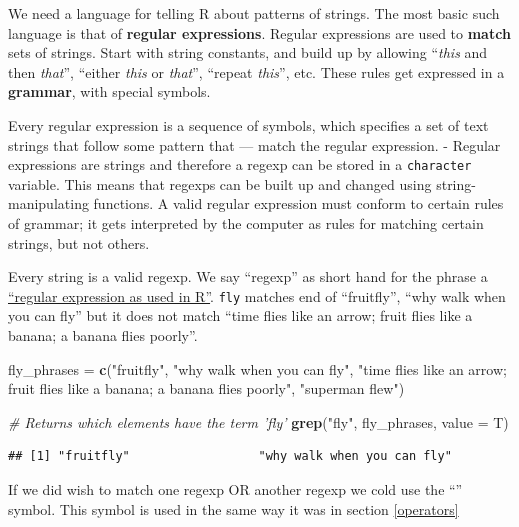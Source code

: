 \documentclass[
]{book}
\newenvironment{Shaded}{\begin{snugshade}}{\end{snugshade}}
\newcommand{\CommentTok}[1]{\textcolor[rgb]{0.56,0.35,0.01}{\textit{#1}}}
\newcommand{\DataTypeTok}[1]{\textcolor[rgb]{0.13,0.29,0.53}{#1}}
\newcommand{\KeywordTok}[1]{\textcolor[rgb]{0.13,0.29,0.53}{\textbf{#1}}}
\newcommand{\NormalTok}[1]{#1}
\newcommand{\StringTok}[1]{\textcolor[rgb]{0.31,0.60,0.02}{#1}}
\begin{document}
We need a language for telling R about patterns of strings. The most basic such language is that of \textbf{regular expressions}. Regular expressions are used to \textbf{match} sets of strings. Start with string constants, and build up by allowing ``\emph{this} and then \emph{that}'', ``either \emph{this} or \emph{that}'', ``repeat \emph{this}'', etc. These rules get expressed in a \textbf{grammar}, with special symbols.

Every regular expression is a sequence of symbols, which specifies a set of text strings that follow some pattern that --- match the regular expression. - Regular expressions are strings and therefore a regexp can be stored in a \texttt{character} variable. This means that regexps can be built up and changed using string-manipulating functions. A valid regular expression must conform to certain rules of grammar; it gets interpreted by the computer as rules for matching certain strings, but not others.

Every string is a valid regexp. We say ``regexp'' as short hand for the phrase a \href{https://stat.ethz.ch/R-manual/R-devel/library/base/html/regex.html}{``regular expression as used in R''}. \texttt{fly} matches end of ``fruitfly'', ``why walk when you can fly'' but it does not match ``time flies like an arrow; fruit flies like a banana; a banana flies poorly''.

\begin{Shaded}
\begin{Highlighting}[]
\NormalTok{fly_phrases =}\StringTok{ }\KeywordTok{c}\NormalTok{(}\StringTok{"fruitfly"}\NormalTok{, }\StringTok{"why walk when you can fly"}\NormalTok{, }\StringTok{"time flies like an arrow; fruit flies like a banana; a banana flies poorly"}\NormalTok{,}
    \StringTok{"superman flew"}\NormalTok{)}

\CommentTok{# Returns which elements have the term 'fly'}
\KeywordTok{grep}\NormalTok{(}\StringTok{"fly"}\NormalTok{, fly_phrases, }\DataTypeTok{value =}\NormalTok{ T)}
\end{Highlighting}
\end{Shaded}

\begin{verbatim}
## [1] "fruitfly"                  "why walk when you can fly"
\end{verbatim}

If we did wish to match one regexp OR another regexp we cold use the ``\textbar{}'' symbol. This symbol is used in the same way it was in section \ref{operators}
\end{document}
